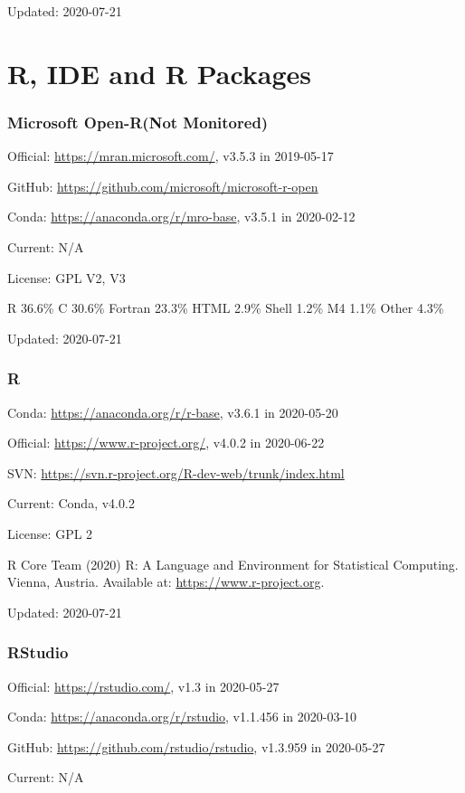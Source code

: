 \documentclass[]{article}
\newcommand{\nm}{{\color{red}(Not Monitored)}}
\begin{document}
Updated: 2020-07-21

\part{R, IDE and R Packages}

\section{Microsoft Open-R\nm}

Official: \url{https://mran.microsoft.com/}, v3.5.3 in 2019-05-17

GitHub: \url{https://github.com/microsoft/microsoft-r-open}

Conda: \url{https://anaconda.org/r/mro-base}, v3.5.1 in 2020-02-12

Current: N/A

License: GPL V2, V3

R 36.6\% C 30.6\% Fortran 23.3\% HTML 2.9\% Shell 1.2\% M4 1.1\% Other 4.3\%

Updated: 2020-07-21

\section{R}

Conda: \url{https://anaconda.org/r/r-base}, v3.6.1 in 2020-05-20

Official: \url{https://www.r-project.org/}, v4.0.2 in 2020-06-22

SVN: \url{https://svn.r-project.org/R-dev-web/trunk/index.html}

Current: Conda, v4.0.2

License: GPL 2

R Core Team (2020) R: A Language and Environment for Statistical Computing. Vienna, Austria. Available at: \url{https://www.r-project.org}.

Updated: 2020-07-21

\section{RStudio}

Official: \url{https://rstudio.com/}, v1.3 in 2020-05-27

Conda: \url{https://anaconda.org/r/rstudio}, v1.1.456 in 2020-03-10

GitHub: \url{https://github.com/rstudio/rstudio}, v1.3.959 in 2020-05-27

Current: N/A
\end{document}
